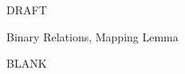 \documentclass[quiz]{mcs}
\begin{document}


\examspace

\begin{center}
{\Large DRAFT}
\end{center}

\begin{center}
{\large Binary Relations, Mapping Lemma}
\end{center}


%


{\color{white} BLANK}
\examspace[2.0in]

%
%
%
\end{document}
